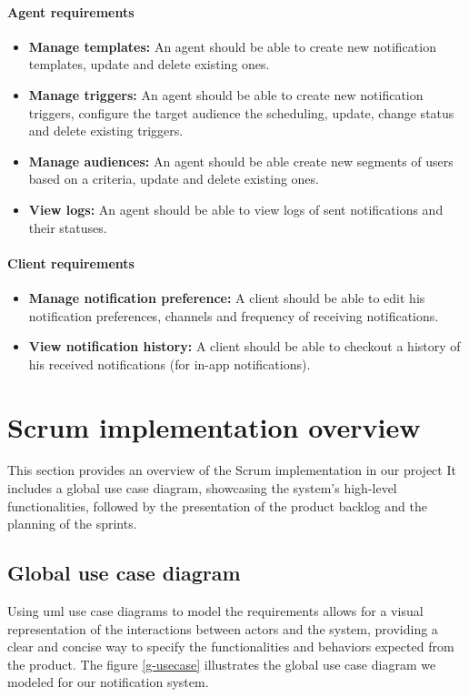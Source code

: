\paragraph*{Agent requirements}
\label{agent-req}
\begin{itemize}
      \item \textbf{Manage templates:} An agent should be able to create new notification templates, update and
            delete existing ones.
      \item \textbf{Manage triggers:} An agent should be able to create new notification triggers, configure
            the target audience the scheduling, update, change status and delete existing triggers.
      \item \textbf{Manage audiences:} An agent should be able create new segments of users based on a
            criteria, update and delete existing ones.
      \item \textbf{View logs:} An agent should be able to view logs of sent notifications and their statuses.
\end{itemize}

\paragraph*{Client requirements}
\label{client-req}
\begin{itemize}
      \item \textbf{Manage notification preference:} A client should be able to edit his notification preferences,
            channels and frequency of receiving notifications.
      \item \textbf{View notification history:} A client should be able to checkout a history of his received
            notifications (for in-app notifications).
\end{itemize}


\section{Scrum implementation overview}
\label{spec}
This section provides an overview of the Scrum implementation in our project It includes a global use case diagram, showcasing the system's
high-level functionalities, followed by the presentation of the product backlog and the planning
of the sprints.

\subsection{Global use case diagram}
Using \acrshort{uml} use case diagrams to model the requirements allows for a visual representation
of the interactions between actors and the system, providing a clear and concise way to specify
the functionalities and behaviors expected from the product. The figure \ref{g-usecase} illustrates the global use case diagram we modeled for our notification system.

